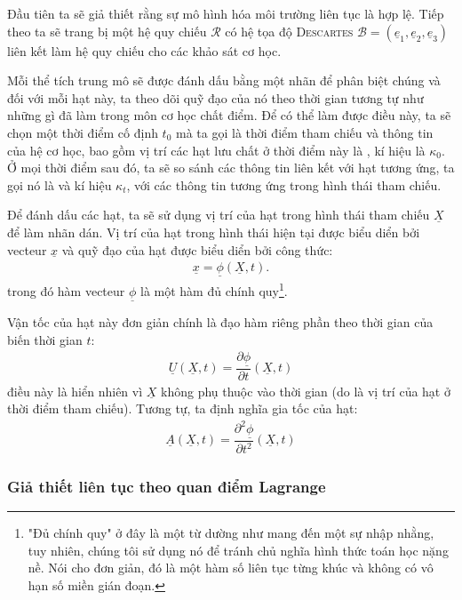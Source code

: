 \documentclass[../../../main.tex]{subfiles}
\begin{document}
    Đầu tiên ta sẽ giả thiết rằng sự mô hình hóa môi trường liên tục là hợp lệ. Tiếp theo ta sẽ trang bị một hệ quy chiếu $\mathcal{R}$ có hệ tọa độ \textsc{Descartes} $\mathcal{B}=(\underline{e}_1,\underline{e}_2,\underline{e}_3)$ liên kết làm hệ quy chiếu cho các khảo sát cơ học.
    
    Mỗi thể tích trung mô sẽ được đánh dấu bằng một nhãn để phân biệt chúng và đối với mỗi hạt này, ta theo dõi quỹ đạo của nó theo thời gian tương tự như những gì đã làm trong môn cơ học chất điểm. Để có thể làm được điều này, ta sẽ chọn một thời điểm cố định $t_0$ mà ta gọi là thời điểm tham chiếu và thông tin của hệ cơ học, bao gồm vị trí các hạt lưu chất ở thời điểm này là , kí hiệu là $\kappa_0$. Ở mọi thời điểm sau đó, ta sẽ so sánh các thông tin liên kết với hạt tương ứng, ta gọi nó là  và kí hiệu $\kappa_t$, với các thông tin tương ứng trong hình thái tham chiếu.

	Để đánh dấu các hạt, ta sẽ sử dụng vị trí của hạt trong hình thái tham chiếu $\underline{X}$ để làm nhãn dán. Vị trí của hạt trong hình thái hiện tại được biểu diển bởi vecteur $\underline{x}$ và quỹ đạo của hạt được biểu diển bởi công thức:
		\begin{align}\label{eq:Lagrange_trajectoire}
			\underline{x}=\underline{\phi}\left(\underline{X},t\right).
		\end{align}
trong đó hàm vecteur $\underline{\phi}$ là một hàm đủ chính quy\footnote{"Đủ chính quy" ở đây là một từ dường như mang đến một sự nhập nhằng, tuy nhiên, chúng tôi sử dụng nó để tránh chủ nghĩa hình thức toán học nặng nề. Nói cho đơn giản, đó là một hàm số liên tục  từng khúc và không có vô hạn số miền gián đoạn.}.

	Vận tốc của hạt này đơn giản chính là đạo hàm riêng phần theo thời gian của biến thời gian $t$:
		\begin{align}
			\underline{U}\left(\underline{X},t\right)=\dfrac{\partial\underline{\phi}}{\partial t}\left(\underline{X},t\right)
		\end{align}
điều này là hiển nhiên vì $\underline{X}$ không phụ thuộc vào thời gian (do là vị trí của hạt ở thời điểm tham chiếu). Tương tự, ta định nghĩa gia tốc của hạt:
		\begin{align}
			\underline{A}\left(\underline{X},t\right)=\dfrac{\partial^2\underline{\phi}}{\partial t^2}\left(\underline{X},t\right)
		\end{align}
	\subsubsection{Giả thiết liên tục theo quan điểm Lagrange}
\end{document}
